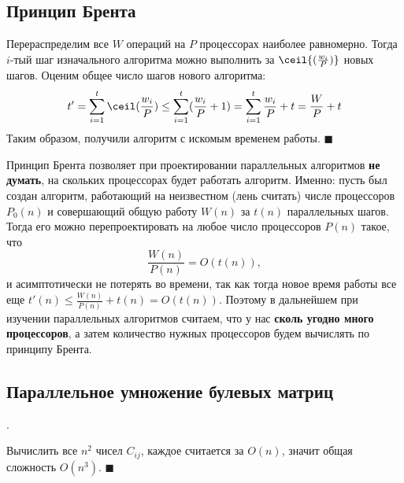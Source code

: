 \subsection{Принцип Брента}

 Перераспределим все $W$ операций на $P$ процессорах наиболее равномерно. Тогда $i$-тый шаг изначального алгоритма можно выполнить за $\ceil{(\frac{w_i}{P})}$ новых шагов. Оценим общее число шагов нового алгоритма:
$$t' = \sum_{i=1}^t \ceil(\frac{w_i}{P}) \leq \sum_{i=1}^t (\frac{w_i}{P} + 1) = \sum_{i=1}^t \frac{w_i}{P} + t = \frac{W}{P} + t$$Таким образом, получили алгоритм с искомым временем работы. $\blacksquare$

 Принцип Брента позволяет при проектировании параллельных алгоритмов \textbf{не думать}, на скольких процессорах будет работать алгоритм. Именно: пусть был создан алгоритм, работающий на неизвестном (лень считать) числе процессоров $P_0(n)$ и совершающий общую работу $W(n)$ за $t(n)$ параллельных шагов. Тогда его можно перепроектировать на любое число процессоров $P(n)$ такое, что $$\frac{W(n)}{P(n)} = O(t(n)),$$ и асимптотически не потерять во времени, так как тогда новое время работы все еще $t'(n) \leq \frac{W(n)}{P(n)} + t(n) = O(t(n))$. Поэтому в дальнейшем при изучении параллельных алгоритмов считаем, что у нас \textbf{сколь угодно много процессоров}, а затем количество нужных процессоров будем вычислять по принципу Брента.

\subsection{Параллельное умножение булевых матриц}

.

 Вычислить все $n^2$ чисел $C_{ij}$, каждое считается за $O(n)$, значит общая сложность $O(n^3)$.  $\blacksquare$

